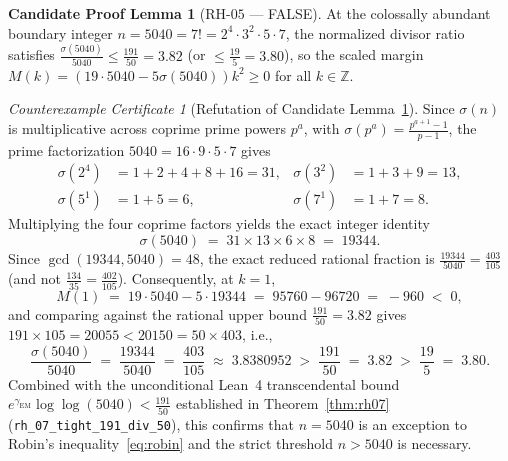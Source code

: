 \documentclass[11pt,a4paper]{article}
\theoremstyle{plain}
\theoremstyle{definition}
\newtheorem{candidate}[theorem]{Candidate Proof Lemma}
\theoremstyle{remark}
\newtheorem{counterexample}[theorem]{Counterexample Certificate}
\newcommand{\Z}{\mathbb{Z}}
\begin{document}
\begin{candidate}[$\mathrm{RH\text{-}05}$ --- FALSE]\label{cand:rh05}
At the colossally abundant boundary integer $n = 5040 = 7! = 2^4 \cdot 3^2 \cdot 5 \cdot 7$, the normalized divisor ratio satisfies $\frac{\sigma(5040)}{5040} \le \frac{191}{50} = 3.82$ (or $\le \frac{19}{5} = 3.80$), so the scaled margin $M(k) = (19 \cdot 5040 - 5\sigma(5040))k^2 \ge 0$ for all $k \in \Z$.
\end{candidate}

\begin{counterexample}[Refutation of Candidate Lemma~\ref{cand:rh05}]
Since $\sigma(n)$ is multiplicative across coprime prime powers $p^a$, with $\sigma(p^a) = \frac{p^{a+1}-1}{p-1}$, the prime factorization $5040 = 16 \cdot 9 \cdot 5 \cdot 7$ gives
\begin{align*}
  \sigma(2^4) &= 1 + 2 + 4 + 8 + 16 = 31, &
  \sigma(3^2) &= 1 + 3 + 9 = 13, \\
  \sigma(5^1) &= 1 + 5 = 6, &
  \sigma(7^1) &= 1 + 7 = 8.
\end{align*}
Multiplying the four coprime factors yields the exact integer identity
\begin{equation}
  \sigma(5040) \;=\; 31 \times 13 \times 6 \times 8 \;=\; 19344.
\end{equation}
Since $\gcd(19344, 5040) = 48$, the exact reduced rational fraction is $\frac{19344}{5040} = \frac{403}{105}$ (and not $\frac{134}{35} = \frac{402}{105}$). Consequently, at $k = 1$,
\begin{equation}
  M(1) \;=\; 19 \cdot 5040 - 5 \cdot 19344 \;=\; 95760 - 96720 \;=\; -960 \;<\; 0,
\end{equation}
and comparing against the rational upper bound $\frac{191}{50} = 3.82$ gives $191 \times 105 = 20055 < 20150 = 50 \times 403$, i.e.,
\begin{equation}
  \frac{\sigma(5040)}{5040} \;=\; \frac{19344}{5040} \;=\; \frac{403}{105} \;\approx\; 3.8380952 \;>\; \frac{191}{50} \;=\; 3.82 \;>\; \frac{19}{5} \;=\; 3.80.
\end{equation}
Combined with the unconditional Lean~4 transcendental bound $e^{\gamma_{\mathrm{EM}}}\log\log(5040) < \frac{191}{50}$ established in Theorem~\ref{thm:rh07} (\texttt{rh\_07\_tight\_191\_div\_50}), this confirms that $n = 5040$ is an exception to Robin's inequality~\eqref{eq:robin} and the strict threshold $n > 5040$ is necessary.
\end{counterexample}

\end{document}
